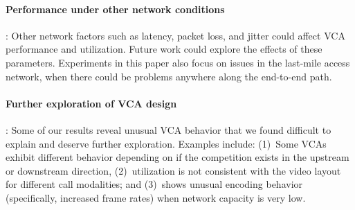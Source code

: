 \paragraph{Performance under other network conditions}: Other network factors
such as latency, packet loss, and jitter could affect VCA performance and
utilization.  Future work could explore the effects of these parameters.
Experiments in this paper also focus on issues in the last-mile access
network, when there could be problems anywhere along the end-to-end path.

\paragraph{Further exploration of VCA design}: Some of our results reveal
unusual VCA behavior that we found difficult to explain and deserve further
exploration. Examples include: (1)~Some VCAs exhibit different behavior
depending on if the competition exists in the upstream or downstream
direction, (2)~\teams utilization is not consistent with the video layout for
different call modalities; and (3)~\meet shows unusual encoding behavior
(specifically, increased frame rates) when network capacity is very low.

